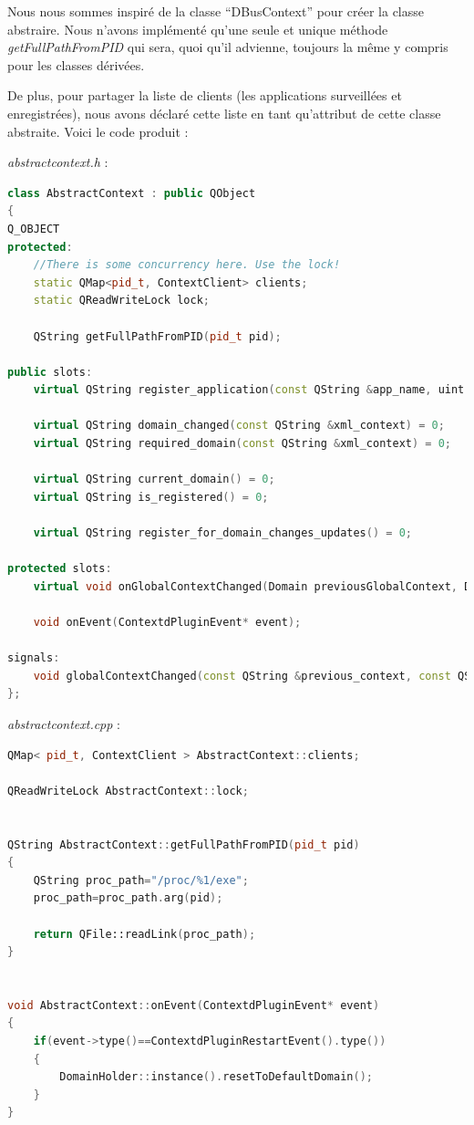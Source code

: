 \documentclass[pdftex,a4paper,titlepage,11pt]{article}
\begin{document}
Nous nous sommes inspiré de la classe ``DBusContext'' pour créer la classe abstraire. Nous n'avons implémenté qu'une seule et unique méthode \textit{getFullPathFromPID} qui sera, quoi qu'il advienne, toujours la même y compris pour les classes dérivées.

De plus, pour partager la liste de clients (les applications surveillées et enregistrées), nous avons déclaré cette liste en tant qu'attribut de cette classe abstraite. Voici le code produit :

\textit{abstractcontext.h} : 
\begin{lstlisting}[language=C++]
class AbstractContext : public QObject
{
Q_OBJECT
protected:
	//There is some concurrency here. Use the lock!
	static QMap<pid_t, ContextClient> clients;
	static QReadWriteLock lock;

	QString getFullPathFromPID(pid_t pid);

public slots:
	virtual QString register_application(const QString &app_name, uint app_pid) = 0;

	virtual QString domain_changed(const QString &xml_context) = 0;
	virtual QString required_domain(const QString &xml_context) = 0;

	virtual QString current_domain() = 0;
	virtual QString is_registered() = 0;

	virtual QString register_for_domain_changes_updates() = 0;

protected slots:
	virtual void onGlobalContextChanged(Domain previousGlobalContext, Domain globalContext) = 0;

	void onEvent(ContextdPluginEvent* event);

signals:
	void globalContextChanged(const QString &previous_context, const QString &new_context);
};
\end{lstlisting}

\textit{abstractcontext.cpp} : 
\begin{lstlisting}[language=C++]
QMap< pid_t, ContextClient > AbstractContext::clients;

QReadWriteLock AbstractContext::lock;


QString AbstractContext::getFullPathFromPID(pid_t pid)
{
	QString proc_path="/proc/%1/exe";
	proc_path=proc_path.arg(pid);

	return QFile::readLink(proc_path);
}


void AbstractContext::onEvent(ContextdPluginEvent* event)
{
	if(event->type()==ContextdPluginRestartEvent().type())
	{
		DomainHolder::instance().resetToDefaultDomain();
	}
}
\end{lstlisting}
\end{document}
